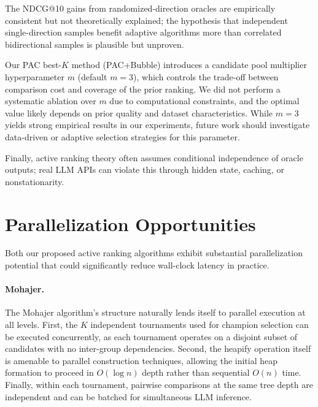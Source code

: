 \documentclass{llmxive}
\begin{document}
The NDCG@10 gains from randomized-direction oracles are empirically consistent but not theoretically explained; the hypothesis that independent single-direction samples benefit adaptive algorithms more than correlated bidirectional samples is plausible but unproven.

Our PAC best-$K$ method (PAC+Bubble) introduces a candidate pool multiplier hyperparameter $m$ (default $m=3$), which controls the trade-off between comparison cost and coverage of the prior ranking. We did not perform a systematic ablation over $m$ due to computational constraints, and the optimal value likely depends on prior quality and dataset characteristics. While $m=3$ yields strong empirical results in our experiments, future work should investigate data-driven or adaptive selection strategies for this parameter.

Finally, active ranking theory often assumes conditional independence of oracle outputs; real LLM APIs can violate this through hidden state, caching, or nonstationarity.



\FloatBarrier





\FloatBarrier
\appendix
\section{Parallelization Opportunities}
\label{sec:parallelization}

Both our proposed active ranking algorithms exhibit substantial parallelization potential that could significantly reduce wall-clock latency in practice.

\paragraph{Mohajer.}
The Mohajer algorithm's structure naturally lends itself to parallel execution at all levels.
First, the $K$ independent tournaments used for champion selection can be executed concurrently, as each tournament operates on a disjoint subset of candidates with no inter-group dependencies.
Second, the heapify operation itself is amenable to parallel construction techniques, allowing the initial heap formation to proceed in $O(\log n)$ depth rather than sequential $O(n)$ time.
Finally, within each tournament, pairwise comparisons at the same tree depth are independent and can be batched for simultaneous LLM inference.
\end{document}
